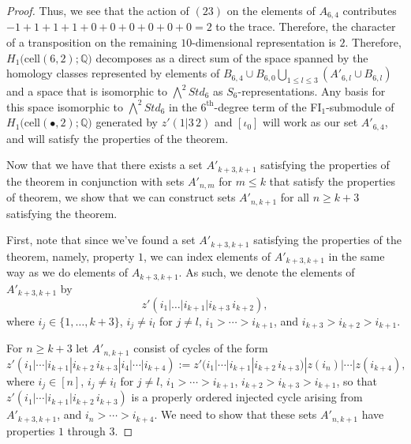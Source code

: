 \documentclass[12py]{amsart}%
\theoremstyle{definition}\newtheorem{definition}[thm]{Definition}
\theoremstyle{definition}
\newcommand{\Q}{\ensuremath{\mathbb{Q}}}
\begin{document}
\begin{proof}
Thus, we see that the action of $(23)$ on the elements of $A_{6,4}$ contributes $-1+1+1+1+0+0+0+0+0+0=2$ to the trace. Therefore, the character of a transposition on the remaining $10$-dimensional representation is $2$. Therefore, $H_{1}\big(\text{cell}(6,2);\Q\big)$ decomposes as a direct sum of the space spanned by the homology classes represented by elements of $B_{6,4}\cup B_{6,0}\bigcup_{1\le l\le 3}(A'_{6,l}\cup B_{6,l})$ and a space that is isomorphic to $\bigwedge^{2}Std_{6}$ as $S_{6}$-representations. Any basis for this space isomorphic to $\bigwedge^{2}Std_{6}$ in the $6^{\text{th}}$-degree term of the FI$_{1}$-submodule of $H_{1}\big(\text{cell}(\bullet, 2);\Q\big)$ generated by $z'(1|3\,2)$ and $[\iota_{0}]$ will work as our set $A'_{6,4}$, and will satisfy the properties of the theorem. 

Now that we have that there exists a set $A'_{k+3, k+1}$ satisfying the properties of the theorem in conjunction with sets $A'_{n,m}$ for $m\le k$ that satisfy the properties of theorem, we show that we can construct sets $A'_{n, k+1}$ for all $n\ge k+3$ satisfying the theorem. 

First, note that since we've found a set $A'_{k+3,k+1}$ satisfying the properties of the theorem, namely, property $1$, we can index elements of $A'_{k+3, k+1}$ in the same way as we do elements of $A_{k+3,k+1}$. As such, we denote the elements of $A'_{k+3,k+1}$ by
\[
z'(i_{1}|\dots|i_{k+1}|i_{k+3}\,i_{k+2}),
\]
where $i_{j}\in \{1,\dots, k+3\}$, $i_{j}\neq i_{l}$ for $j\neq l$, $i_{1}>\cdots>i_{k+1}$, and $i_{k+3}>i_{k+2}>i_{k+1}$.

For $n\ge k+3$ let $A'_{n,k+1}$ consist of cycles of the form
\[
z'(i_{1}|\cdots|i_{k+1}|i_{k+2}\,i_{k+3}|i_{4}|\cdots|i_{k+4}):=z'(i_{1}|\cdots|i_{k+1}|i_{k+2}\,i_{k+3})|z(i_{n})|\cdots|z(i_{k+4}),
\]
where $i_{j}\in [n]$, $i_{j}\neq i_{l}$ for $j\neq l$, $i_{1}>\cdots>i_{k+1}$, $i_{k+2}>i_{k+3}>i_{k+1}$, so that $z'(i_{1}|\cdots|i_{k+1}|i_{k+2}\,i_{k+3})$ is a properly ordered injected cycle arising from $A'_{k+3,k+1}$, and $i_{n}>\cdots>i_{k+4}$. We need to show that these sets $A'_{n,k+1}$ have properties $1$ through $3$.


\end{proof}
\end{document}
